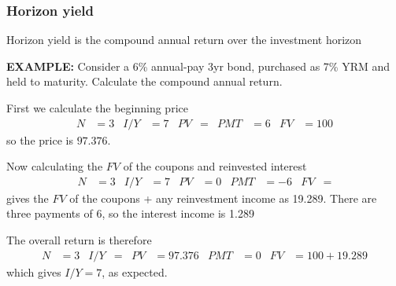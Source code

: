 \documentclass[../notes_compiled.tex]{subfiles}
\begin{document}
\subsubsection{Horizon yield}
\begin{itemize}
\item Horizon yield is the compound annual return over the investment horizon

{\color{RedViolet}
\item[] \textbf{EXAMPLE:} Consider a 6\% annual-pay 3yr bond, purchased as 7\% YRM and held to maturity. Calculate the compound annual return.

}
{\color{RoyalBlue}
\item[] First we calculate the beginning price
\begin{align*}
N&=3  & I / Y &= 7 & PV &= & PMT &=6 & FV &=100
\end{align*}
so the price is $97.376$.

\item[] Now calculating the $FV$ of the coupons and reinvested interest
\begin{align*}
N&=3  & I / Y &= 7 & PV &=0 & PMT &=-6 & FV &=
\end{align*}
gives the $FV$ of the coupons + any reinvestment income as 19.289. There are three payments of 6, so the interest income is 1.289

\item[] The overall return is therefore
\begin{align*}
N&=3  & I / Y &=  & PV &=97.376 & PMT &=0 & FV &=100 + 19.289
\end{align*}
which gives $I / Y = 7$, as expected.
}
\end{itemize}
\end{document}

